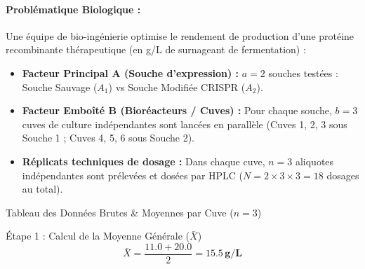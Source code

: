 \documentclass[11pt,a4paper]{article}
\begin{document}
\paragraph{Problématique Biologique :}
Une équipe de bio-ingénierie optimise le rendement de production d'une protéine recombinante thérapeutique (en g/L de surnageant de fermentation) :
\begin{itemize}[leftmargin=*, label=\faCheck]
  \item \textbf{Facteur Principal A (Souche d'expression) :} $a = 2$ souches testées : Souche Sauvage ($A_1$) vs Souche Modifiée CRISPR ($A_2$).
  \item \textbf{Facteur Emboîté B (Bioréacteurs / Cuves) :} Pour chaque souche, $b = 3$ cuves de culture indépendantes sont lancées en parallèle (Cuves 1, 2, 3 sous Souche 1 ; Cuves 4, 5, 6 sous Souche 2).
  \item \textbf{Réplicats techniques de dosage :} Dans chaque cuve, $n = 3$ aliquotes indépendantes sont prélevées et dosées par HPLC ($N = 2 \times 3 \times 3 = 18$ dosages au total).
\end{itemize}

\begin{stepbox}{Tableau des Données Brutes \& Moyennes par Cuve ($n=3$)}
\begin{center}
\end{center}
\end{stepbox}

\begin{stepbox}{Étape 1 : Calcul de la Moyenne Générale ($\bar{X}$)}
\begin{equation*}
\bar{X} = \frac{11.0 + 20.0}{2} = \mathbf{15.5\,\text{g/L}}
\end{equation*}
\end{stepbox}
\end{document}
